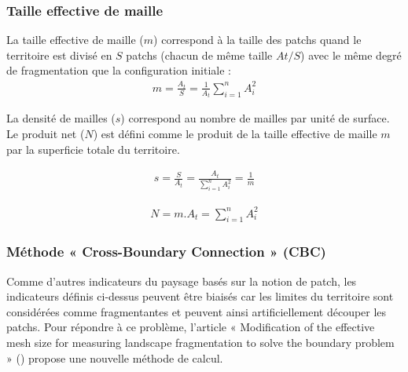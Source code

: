 \documentclass[11pt]{article}
\newcommand{\mycite}[1]{ (\cite{#1})}
\begin{document}
\subsubsection{Taille effective de maille}

La taille effective de maille ($m$) correspond à la taille des patchs quand le territoire est divisé en $S$ patchs (chacun de même taille $At/S$) avec le même degré de fragmentation que la configuration initiale :
\begin{align*}
m = \frac{A_{t}}{S} = \frac{1}{A_{t}}\sum_{i=1}^{n}A_{i}^{2}
\end{align*}

La densité de mailles ($s$) correspond au nombre de mailles par unité de surface.
Le produit net ($N$) est défini comme le produit de la taille effective de maille $m$ par la superficie totale du territoire.

\hspace*{-0.5cm}
\begin{minipage}[c][1cm]{.46\linewidth}
\begin{align*}
s = \frac{S}{A_{t}} = \frac{A_{t}}{\sum_{i=1}^{n}A_{i}^{2}} = \frac{1}{m}
\end{align*}
\end{minipage}
\begin{minipage}[c][1cm]{.46\linewidth}
\begin{align*}
N = m.{A_{t}} = \sum_{i=1}^{n}A_{i}^{2}
\end{align*}
\end{minipage}





\subsubsection{Méthode « Cross-Boundary Connection » (CBC)}
\label{sec:cbc}

Comme d'autres indicateurs du paysage basés sur la notion de patch, les indicateurs définis ci-dessus peuvent être biaisés car les limites du territoire sont considérées comme fragmentantes et peuvent ainsi artificiellement découper les patchs. Pour répondre à ce problème, l'article « Modification of the effective mesh size for measuring landscape fragmentation to solve the boundary problem »\mycite{moser} propose une nouvelle méthode de calcul.
\end{document}
